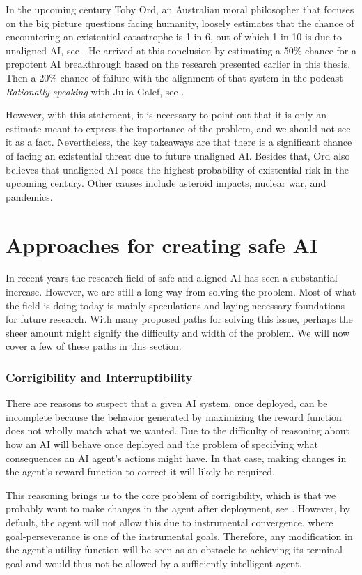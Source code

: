 \documentclass[12pt,A4]{report}
\theoremstyle{definition}
\begin{document}
In the upcoming century Toby Ord, an Australian moral philosopher that focuses on the big picture questions facing humanity, loosely estimates that the chance of encountering an existential catastrophe is 1 in 6, out of which 1 in 10 is due to unaligned  AI, see \citet[c.6]{Precipice}. He arrived at this conclusion by estimating a 50\% chance for a prepotent AI breakthrough based on the research presented earlier in this thesis. Then a 20\% chance of failure with the alignment of that system in the podcast \textit{Rationally speaking} with Julia Galef, see \citet[26:15]{RationallySpeaking}. 

However, with this statement, it is necessary to point out that it is only an estimate meant to express the importance of the problem, and we should not see it as a fact. Nevertheless, the key takeaways are that there is a significant chance of facing an existential threat due to future unaligned AI. Besides that, Ord also believes that unaligned AI poses the highest probability of existential risk in the upcoming century. Other causes include asteroid impacts, nuclear war, and pandemics. 


\section{Approaches for creating safe AI}
In recent years the research field of safe and aligned AI has seen a substantial increase. However, we are still a long way from solving the problem. Most of what the field is doing today is mainly speculations and laying necessary foundations for future research. With many proposed paths for solving this issue, perhaps the sheer amount might signify the difficulty and width of the problem. We will now cover a few of these paths in this section.


\subsubsection{Corrigibility and Interruptibility }
There are reasons to suspect that a given AI system, once deployed, can be incomplete because the behavior generated by maximizing the reward function does not wholly match what we wanted. Due to the difficulty of reasoning about how an AI will behave once deployed and the problem of specifying what consequences an AI agent's actions might have. In that case, making changes in the agent's reward function to correct it will likely be required.  

This reasoning brings us to the core problem of corrigibility, which is that we probably want to make changes in the agent after deployment, see \citet{Corrigibility}. However, by default, the agent will not allow this due to instrumental convergence, where goal-perseverance is one of the instrumental goals. Therefore, any modification in the agent's utility function will be seen as an obstacle to achieving its terminal goal and would thus not be allowed by a sufficiently intelligent agent. 
\end{document}
